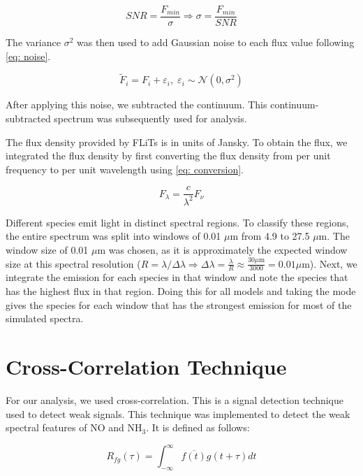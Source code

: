 \documentclass[twoside, single, authoryear, semicolon, 12pt]{lion-msc}
\newcommand{\4}{$_4$}
\newcommand{\3}{$_3$}
\newcommand{\2}{$_2$}
\begin{document}
\begin{equation}
    SNR = \frac{F_{min}}{\sigma}\Rightarrow\sigma=\frac{F_{min}}{SNR}
    \label{eq: SNR}
\end{equation}

The variance $\sigma^2$ was then used to add Gaussian noise to each flux value following \autoref{eq: noise}.

\begin{equation}
    \tilde{F}_i = F_i + \varepsilon_i,\;\varepsilon_i\sim\mathcal{N}(0, \sigma^2)
    \label{eq: noise}
\end{equation}

After applying this noise, we subtracted the continuum. This continuum-subtracted spectrum was subsequently used for analysis.


The flux density provided by FLiTs is in units of Jansky. To obtain the flux, we integrated the flux density by first converting the flux density from per unit frequency to per unit wavelength using \autoref{eq: conversion}.

\begin{equation}
    F_\lambda=\frac{c}{\lambda^2}F_\nu
    \label{eq: conversion}
\end{equation}

Different species emit light in distinct spectral regions. To classify these regions, the entire spectrum was split into windows of 0.01 $\mu$m from 4.9 to 27.5 $\mu$m. The window size of 0.01 $\mu$m was chosen, as it is approximately the expected window size at this spectral resolution ($R=\lambda/\Delta\lambda\Rightarrow\Delta\lambda=\frac{\lambda}{R}\approx\frac{30 \mu \mathrm{m}}{3000}=0.01 \mu \mathrm{m}$). Next, we integrate the emission for each species in that window and note the species that has the highest flux in that region. Doing this for all models and taking the mode gives the species for each window that has the strongest emission for most of the simulated spectra.  


\section{Cross-Correlation Technique}
For our analysis, we used cross-correlation. This is a signal detection technique used to detect weak signals. This technique was implemented to detect the weak spectral features of NO and NH\3. It is defined as follows: 

\begin{equation}
    R_{fg}(\tau)=\int^\infty_{-\infty}\overline{f(t)}g(t+\tau)dt
\end{equation}
\end{document}
